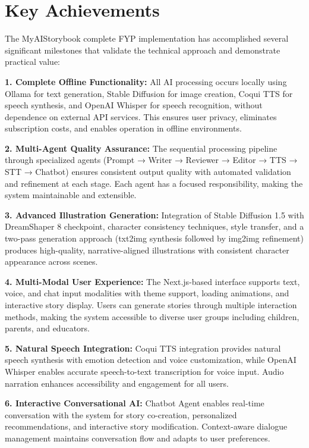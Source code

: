 \section{Key Achievements}
The MyAIStorybook complete FYP implementation has accomplished several significant milestones that validate the technical approach and demonstrate practical value:

\textbf{1. Complete Offline Functionality:} All AI processing occurs locally using Ollama for text generation, Stable Diffusion for image creation, Coqui TTS for speech synthesis, and OpenAI Whisper for speech recognition, without dependence on external API services. This ensures user privacy, eliminates subscription costs, and enables operation in offline environments.

\textbf{2. Multi-Agent Quality Assurance:} The sequential processing pipeline through specialized agents (Prompt → Writer → Reviewer → Editor → TTS → STT → Chatbot) ensures consistent output quality with automated validation and refinement at each stage. Each agent has a focused responsibility, making the system maintainable and extensible.

\textbf{3. Advanced Illustration Generation:} Integration of Stable Diffusion 1.5 with DreamShaper 8 checkpoint, character consistency techniques, style transfer, and a two-pass generation approach (txt2img synthesis followed by img2img refinement) produces high-quality, narrative-aligned illustrations with consistent character appearance across scenes.

\textbf{4. Multi-Modal User Experience:} The Next.js-based interface supports text, voice, and chat input modalities with theme support, loading animations, and interactive story display. Users can generate stories through multiple interaction methods, making the system accessible to diverse user groups including children, parents, and educators.

\textbf{5. Natural Speech Integration:} Coqui TTS integration provides natural speech synthesis with emotion detection and voice customization, while OpenAI Whisper enables accurate speech-to-text transcription for voice input. Audio narration enhances accessibility and engagement for all users.

\textbf{6. Interactive Conversational AI:} Chatbot Agent enables real-time conversation with the system for story co-creation, personalized recommendations, and interactive story modification. Context-aware dialogue management maintains conversation flow and adapts to user preferences.

